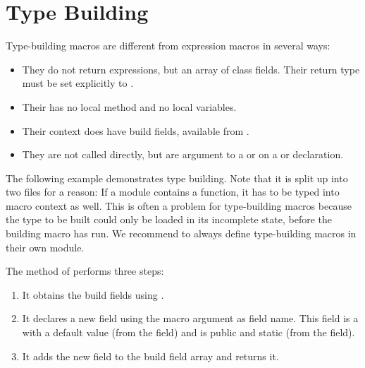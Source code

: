 \section{Type Building}
\label{macro-type-building}

Type-building macros are different from expression macros in several ways:

\begin{itemize}
	\item They do not return expressions, but an array of class fields. Their return type must be set explicitly to .
	\item Their  has no local method and no local variables.
	\item Their context does have build fields, available from .
	\item They are not called directly, but are argument to a  or   on a  or  declaration.
\end{itemize}

The following example demonstrates type building. Note that it is split up into two files for a reason: If a module contains a  function, it has to be typed into macro context as well. This is often a problem for type-building macros because the type to be built could only be loaded in its incomplete state, before the building macro has run. We recommend to always define type-building macros in their own module.


The  method of  performs three steps:

\begin{enumerate}
	\item It obtains the build fields using .
	\item It declares a new  field using the  macro argument as field name. This field is a   with a default value  (from the  field) and is public and static (from the  field).
	\item It adds the new field to the build field array and returns it.
\end{enumerate}

